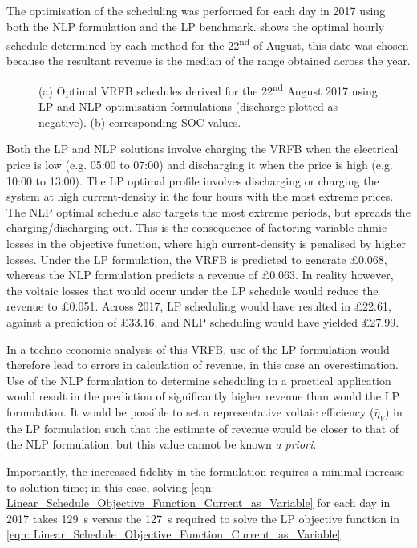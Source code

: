 \documentclass[preprint,3p,review,authoryear,10pt]{elsarticle}
\begin{document}
The optimisation of the scheduling was performed for each day in 2017 using both the NLP formulation and the LP benchmark.  shows the optimal hourly schedule determined by each method for the 22\textsuperscript{nd} of August, this date was chosen because the resultant revenue is the median of the range obtained across the year.

\begin{figure}[!ht]
\centering
{}
\caption{(a) Optimal VRFB schedules derived for the 22\textsuperscript{nd} August 2017 using LP and NLP optimisation formulations (discharge plotted as negative). (b) corresponding SOC values.}
\end{figure}

Both the LP and NLP solutions involve charging the VRFB when the electrical price is low (e.g. 05:00 to 07:00) and discharging it when the price is high (e.g. 10:00 to 13:00). The LP optimal profile involves discharging or charging the system at high current-density in the four hours with the most extreme prices. The NLP optimal schedule also targets the most extreme periods, but spreads the charging/discharging out. This is the consequence of factoring variable ohmic losses in the objective function, where high current-density is penalised by higher losses. Under the LP formulation, the VRFB is predicted to generate \pounds 0.068, whereas the NLP formulation predicts a revenue of \pounds 0.063. In reality however, the voltaic losses that would occur under the LP schedule would reduce the revenue to \pounds 0.051. Across 2017, LP scheduling would have resulted in \pounds 22.61, against a prediction of \pounds 33.16, and NLP scheduling would have yielded \pounds 27.99.

In a techno-economic analysis of this VRFB, use of the LP formulation would therefore lead to errors in calculation of revenue, in this case an overestimation. Use of the NLP formulation to determine scheduling in a practical application would result in the prediction of significantly higher revenue than would the LP formulation. It would be possible to set a representative voltaic efficiency ($\bar\eta_V$) in the LP formulation such that the estimate of revenue would be closer to that of the NLP formulation, but this value cannot be known \textit{a priori}.

Importantly, the increased fidelity in the formulation requires a minimal increase to solution time; in this case, solving  \cref{eqn: Linear_Schedule_Objective_Function_Current_as_Variable} for each day in 2017 takes \SI{129}{\second} versus the \SI{127}{\second} required to solve the LP objective function in \cref{eqn: Linear_Schedule_Objective_Function_Current_as_Variable}.
\end{document}
